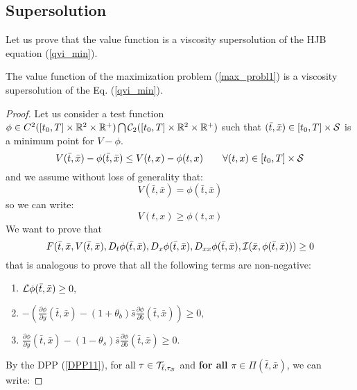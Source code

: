 \subsection{Supersolution}

Let us prove that the value function is a viscosity supersolution of the HJB equation (\ref{qvi_min}). 

\begin{Theorem}\label{supersolution_th}
 The value function of the maximization problem (\ref{max_probl1}) is a viscosity supersolution of the Eq. (\ref{qvi_min}).
\end{Theorem}

\begin{proof}
Let us consider a test function $ \phi \in C^2([t_0,T] \times \mathbb{R}^2\times \mathbb{R}^+) \bigcap \mathcal{C}_2([t_0,T] \times \mathbb{R}^2\times \mathbb{R}^+)$ such that 
$(\bar t,\bar x) \in [t_0,T] \times \mathcal{S}$  is a minimum point for $V-\phi$.\\
\begin{equation}
 V(\bar t,\bar x) - \phi(\bar t,\bar x) \leq V(t,x) - \phi(t, x) \hspace{2em} \forall (t,x) \in [t_0,T] \times \mathcal{S}
\end{equation}
and we assume without loss of generality that:
\begin{equation}\label{min_point}
V(\bar t,\bar x) = \phi(\bar t,\bar x)  
\end{equation}
so we can write:
\begin{equation}\label{min_point2}
V(t,x) \geq \phi(t, x) 
\end{equation}
We want to prove that
$$ F(\bar t,\bar x,V(\bar t, \bar x),D_t \phi(\bar t, \bar x),D_x \phi(\bar t, \bar x),D_{xx}\phi(\bar t, \bar x),
\mathcal{I}(\bar x,\phi(\bar t, \bar x))) \geq 0  $$
that is analogous to prove that all the following terms are non-negative:
\begin{enumerate}
 \item 
 $ \mathcal{L} \phi(\bar t, \bar x) \geq 0 ,$
 \item $-\left(\frac{\partial \phi}{\partial y}(\bar t, \bar x)
 -(1+\theta_b) \bar s \frac{\partial \phi}{\partial b}(\bar t, \bar x)\right) \geq 0,$
 \item $\frac{\partial \phi}{\partial y}(\bar t, \bar x)-(1-\theta_s) \bar s \frac{\partial \phi}{\partial b}(\bar t, \bar x) \geq 0.$
\end{enumerate}
By the DPP (\ref{DPP11}), for all $\tau \in \mathcal{T}_{\bar t,\tau_{\mathcal{S}}}$ and \textbf{for all} $\pi \in \Pi(\bar t, \bar x)$, we can write:

\end{proof}
